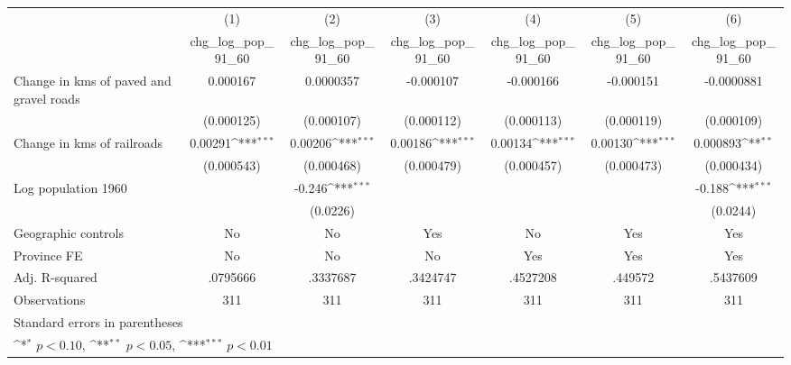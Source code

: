 {
\def\sym#1{\ifmmode^{#1}\else\(^{#1}\)\fi}
\begin{tabular}{l*{6}{c}}
\hline\hline
                    &\multicolumn{1}{c}{(1)}&\multicolumn{1}{c}{(2)}&\multicolumn{1}{c}{(3)}&\multicolumn{1}{c}{(4)}&\multicolumn{1}{c}{(5)}&\multicolumn{1}{c}{(6)}\\
                    &\multicolumn{1}{c}{chg\_log\_pop\_91\_60}&\multicolumn{1}{c}{chg\_log\_pop\_91\_60}&\multicolumn{1}{c}{chg\_log\_pop\_91\_60}&\multicolumn{1}{c}{chg\_log\_pop\_91\_60}&\multicolumn{1}{c}{chg\_log\_pop\_91\_60}&\multicolumn{1}{c}{chg\_log\_pop\_91\_60}\\
\hline
Change in kms of paved and gravel roads&    0.000167         &   0.0000357         &   -0.000107         &   -0.000166         &   -0.000151         &  -0.0000881         \\
                    &  (0.000125)         &  (0.000107)         &  (0.000112)         &  (0.000113)         &  (0.000119)         &  (0.000109)         \\
[1em]
Change in kms of railroads&     0.00291\sym{***}&     0.00206\sym{***}&     0.00186\sym{***}&     0.00134\sym{***}&     0.00130\sym{***}&    0.000893\sym{**} \\
                    &  (0.000543)         &  (0.000468)         &  (0.000479)         &  (0.000457)         &  (0.000473)         &  (0.000434)         \\
[1em]
Log population 1960 &                     &      -0.246\sym{***}&                     &                     &                     &      -0.188\sym{***}\\
                    &                     &    (0.0226)         &                     &                     &                     &    (0.0244)         \\
\hline
Geographic controls &          No         &          No         &         Yes         &          No         &         Yes         &         Yes         \\
Province FE         &          No         &          No         &          No         &         Yes         &         Yes         &         Yes         \\
Adj. R-squared      &    .0795666         &    .3337687         &    .3424747         &    .4527208         &     .449572         &    .5437609         \\
Observations        &         311         &         311         &         311         &         311         &         311         &         311         \\
\hline\hline
\multicolumn{7}{l}{\footnotesize Standard errors in parentheses}\\
\multicolumn{7}{l}{\footnotesize \sym{*} \(p<0.10\), \sym{**} \(p<0.05\), \sym{***} \(p<0.01\)}\\
\end{tabular}
}
